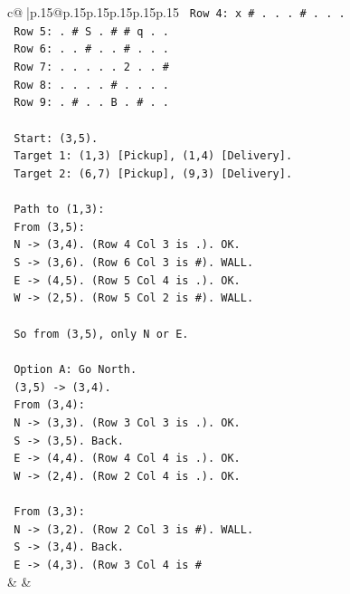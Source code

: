 \documentclass{article}
\begin{document}
{\begin{supertabular}{c@{$\;$}|p{.15\linewidth}@{}p{.15\linewidth}p{.15\linewidth}p{.15\linewidth}p{.15\linewidth}p{.15\linewidth}}
{{{\texttt{   Row 4: x \# . . . \# . . .} \\
\texttt{   Row 5: . \# S . \# \# q . .} \\
\texttt{   Row 6: . . \# . . \# . . .} \\
\texttt{   Row 7: . . . . . 2 . . \#} \\
\texttt{   Row 8: . . . . \# . . . .} \\
\texttt{   Row 9: . \# . . B . \# . .} \\
\\ 
\texttt{   Start: (3,5).} \\
\texttt{   Target 1: (1,3) {[}Pickup{]}, (1,4) {[}Delivery{]}.} \\
\texttt{   Target 2: (6,7) {[}Pickup{]}, (9,3) {[}Delivery{]}.} \\
\\ 
\texttt{   Path to (1,3):} \\
\texttt{   From (3,5):} \\
\texttt{   N {-}> (3,4). (Row 4 Col 3 is .). OK.} \\
\texttt{   S {-}> (3,6). (Row 6 Col 3 is \#). WALL.} \\
\texttt{   E {-}> (4,5). (Row 5 Col 4 is .). OK.} \\
\texttt{   W {-}> (2,5). (Row 5 Col 2 is \#). WALL.} \\
\\ 
\texttt{   So from (3,5), only N or E.} \\
\\ 
\texttt{   Option A: Go North.} \\
\texttt{   (3,5) {-}> (3,4).} \\
\texttt{   From (3,4):} \\
\texttt{   N {-}> (3,3). (Row 3 Col 3 is .). OK.} \\
\texttt{   S {-}> (3,5). Back.} \\
\texttt{   E {-}> (4,4). (Row 4 Col 4 is .). OK.} \\
\texttt{   W {-}> (2,4). (Row 2 Col 4 is .). OK.} \\
\\ 
\texttt{   From (3,3):} \\
\texttt{   N {-}> (3,2). (Row 2 Col 3 is \#). WALL.} \\
\texttt{   S {-}> (3,4). Back.} \\
\texttt{   E {-}> (4,3). (Row 3 Col 4 is \#} \\
            }
        }
    }
    & & \\ \\


\end{supertabular}}
\end{document}
